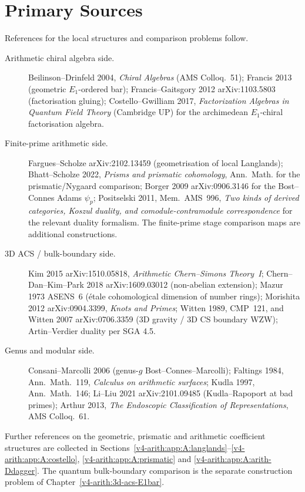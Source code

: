\section*{Primary Sources}
\label{v4-arith:w9-r5:bibliography}

References for the local structures and comparison problems follow.

\begin{description}
\item[Arithmetic chiral algebra side.]
Beilinson--Drinfeld 2004, \emph{Chiral Algebras} (AMS Colloq.~51);
Francis 2013 (geometric \(E_{1}\)-ordered bar);
Francis--Gaitsgory 2012 arXiv:1103.5803 (factorisation gluing);
Costello--Gwilliam 2017, \emph{Factorization Algebras in Quantum
Field Theory} (Cambridge UP) for the archimedean \(E_{1}\)-chiral
factorisation algebra.
\item[Finite-prime arithmetic side.]
Fargues--Scholze arXiv:2102.13459 (geometrisation of local Langlands);
Bhatt--Scholze 2022, \emph{Prisms and prismatic cohomology}, Ann.~Math.
for the prismatic/Nygaard comparison; Borger 2009 arXiv:0906.3146
for the Bost--Connes Adams \(\psi_{p}\); Positselski 2011, Mem.~AMS~996,
\emph{Two kinds of derived categories, Koszul duality, and
comodule-contramodule correspondence} for the relevant duality
formalism. The finite-prime stage comparison maps are additional
constructions.
\item[3D ACS / bulk-boundary side.]
Kim 2015 arXiv:1510.05818, \emph{Arithmetic Chern--Simons Theory~I};
Chern--Dan--Kim--Park 2018 arXiv:1609.03012 (non-abelian extension);
Mazur 1973 ASENS~6 (\'etale cohomological dimension of number rings);
Morishita 2012 arXiv:0904.3399, \emph{Knots and Primes};
Witten 1989, CMP~121, and Witten 2007 arXiv:0706.3359 (3D gravity /
3D CS boundary WZW); Artin--Verdier duality per SGA 4.5.
\item[Genus and modular side.]
Consani--Marcolli 2006 (genus-\(g\)
Bost--Connes--Marcolli); Faltings 1984, Ann.~Math.~119, \emph{Calculus
on arithmetic surfaces}; Kudla 1997, Ann.~Math.~146; Li--Liu 2021
arXiv:2101.09485 (Kudla--Rapoport at bad primes); Arthur 2013,
\emph{The Endoscopic Classification of Representations}, AMS Colloq.~61.
\end{description}

Further references on the geometric, prismatic and arithmetic
coefficient structures are collected in
Sections~\ref{v4-arith:app:A:langlands}--\ref{v4-arith:app:A:costello},
\ref{v4-arith:app:A:prismatic} and
\ref{v4-arith:app:A:arith-Ddagger}. The quantum bulk-boundary
comparison is the separate construction problem of
Chapter~\ref{v4-arith:3d-acs-E1bar}.
